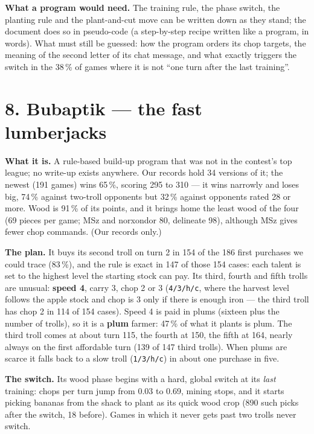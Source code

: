 \documentclass[10pt,a4paper]{article}
\newcommand{\src}[1]{{\small\color{muted}#1}}
\begin{document}
\textbf{What a program would need.} The training rule, the phase switch, the planting rule and the plant-and-cut move can be written down as they stand; the document  does so in pseudo-code (a step-by-step recipe written like a program, in words). What must still be guessed: how the program orders its chop targets, the meaning of the second letter of its chat message, and what exactly triggers the switch in the 38\,\% of games where it is not ``one turn after the last training''.

\section*{8. Bubaptik --- the fast lumberjacks}

\textbf{What it is.} A rule-based build-up program that was not in the contest's top league; no write-up exists anywhere. Our records hold 34 versions of it; the newest (191 games) wins 65\,\%, scoring 295 to 310 --- it wins narrowly and loses big, 74\,\% against two-troll opponents but 32\,\% against opponents rated 28 or more. Wood is 91\,\% of its points, and it brings home the least wood of the four (69 pieces per game; MSz and norxondor 80, delineate 98), although MSz gives fewer chop commands. \src{(Our records only.)}

\textbf{The plan.} It buys its second troll on turn 2 in 154 of the 186 first purchases we could trace (83\,\%), and the rule is exact in 147 of those 154 cases: each talent is set to the highest level the starting stock can pay. Its third, fourth and fifth trolls are unusual: \textbf{speed 4}, carry 3, chop 2 or 3 (\texttt{4/3/h/c}, where the harvest level follows the apple stock and chop is 3 only if there is enough iron --- the third troll has chop 2 in 114 of 154 cases). Speed 4 is paid in plums (sixteen plus the number of trolls), so it is a \textbf{plum} farmer: 47\,\% of what it plants is plum. The third troll comes at about turn 115, the fourth at 150, the fifth at 164, nearly always on the first affordable turn (139 of 147 third trolls). When plums are scarce it falls back to a slow troll (\texttt{1/3/h/c}) in about one purchase in five.

\textbf{The switch.} Its wood phase begins with a hard, global switch at its \emph{last} training: chops per turn jump from 0.03 to 0.69, mining stops, and it starts picking bananas from the shack to plant as its quick wood crop (890 such picks after the switch, 18 before). Games in which it never gets past two trolls never switch.
\end{document}
